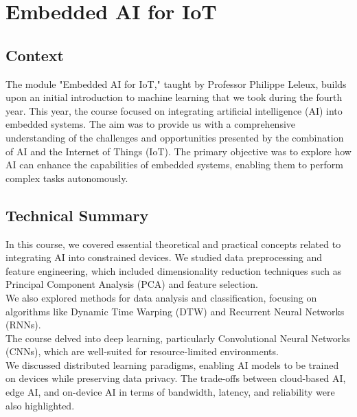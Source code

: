 
\section{Embedded AI for IoT}
\subsection{Context}
\indent \indent The module "Embedded AI for IoT," taught by Professor Philippe Leleux, builds upon an initial introduction to machine learning that we took during the fourth year. 
This year, the course focused on integrating artificial intelligence (AI) into embedded systems. 
The aim was to provide us with a comprehensive understanding of the challenges and opportunities presented by the combination of AI and the Internet of Things (IoT).
The primary objective was to explore how AI can enhance the capabilities of embedded systems, enabling them to perform complex tasks autonomously.

\subsection{Technical Summary}
\indent \indent In this course, we covered essential theoretical and practical concepts related to integrating AI into constrained devices. 
We studied data preprocessing and feature engineering, which included dimensionality reduction techniques such as Principal Component Analysis (PCA) and feature selection. \\
We also explored methods for data analysis and classification, focusing on algorithms like Dynamic Time Warping (DTW) and Recurrent Neural Networks (RNNs). \\
The course delved into deep learning, particularly Convolutional Neural Networks (CNNs), which are well-suited for resource-limited environments. \\
We discussed distributed learning paradigms, enabling AI models to be trained on devices while preserving data privacy. 
The trade-offs between cloud-based AI, edge AI, and on-device AI in terms of bandwidth, latency, and reliability were also highlighted.

